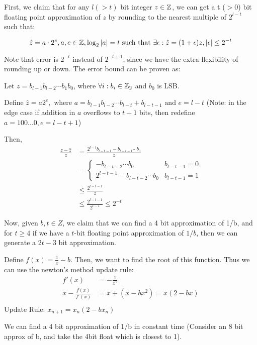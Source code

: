 First, we claim that for any $l(>t)$ bit integer $z \in \mathbb{Z}$, we can get a t ($>0$) bit floating point approximation of $z$ by rounding to the nearest multiple of $2^{l-t}$ such that:

\[
\hat{z} = a \cdot 2^e, a, e \in \mathbb{Z},  \log_2{|a|} = t \text{ such that } \exists \epsilon: \hat{z} = (1+\epsilon)z, |\epsilon| \le 2^{-t} 
\]

Note that error is $2^{-t}$ instead of $2^{-t+1}$, since we have the extra flexibility of rounding up or down. The error bound can be proven as:

Let $z = b_{l-1}b_{l-2} \cdots b_1 b_0$, where $\forall i: b_i \in \mathbb{Z}_2$ and $b_0$ is LSB.

Define \(\hat{z} =a 2^e, \text{ where } a = b_{l-1}b_{l-2} \cdots b_{l-t} + b_{l-t-1} \text{ and } e = l-t\) (Note: in the edge case if addition in $a$ overflows to $t+1$ bits, then redefine $a = 100...0, e = l-t+1$)

Then, 
\begin{align*}
    \frac{z - \hat{z}}{z} &= \frac{2^{l-t}b_{l-t-1} - b_{l-t-1} \cdots b_0}{z} \\
    &= \begin{cases}
        - b_{l-t-2} \cdots b_0 & b_{l-t-1} = 0 \\
        2^{l-t-1} - b_{l-t-2} \cdots b_0 & b_{l-t-1} = 1
    \end{cases} \\
    &\le \frac{2^{l-t-1}}{z} \\
    &\le \frac{2^{l-t-1}}{2^{l-1}} \le 2^{-t}
\end{align*}

Now, given $b, t \in Z$, we claim that we can find a 4 bit approximation of 1/b, and for $t \ge 4$ if we have a $t$-bit floating point approximation of $1/b$, then we can generate a $2t-3$ bit approximation.

Define $f(x) = \frac{1}{x} - b$. Then, we want to find the root of this function. Thus we can use the newton's method update rule:
\begin{align*}
    f'(x) &= -\frac{1}{x^2} \\
    x - \frac{f(x)}{f'(x)} &= x + (x - bx^2) = x(2 - bx) \\
\end{align*}
Update Rule: $x_{n+1} = x_n(2 -bx_n)$

We can find a 4 bit approximation of 1/b in constant time (Consider an 8 bit approx of b, and take the 4bit float which is closest to 1).

